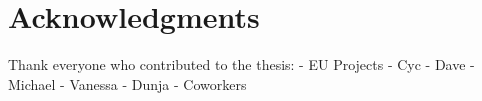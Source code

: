 % 
\chapter*{Acknowledgments}

Thank everyone who contributed to the thesis:
- EU Projects
- Cyc
- Dave
- Michael
- Vanessa
- Dunja
- Coworkers